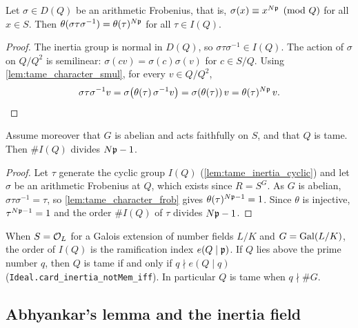 \begin{lemma}
  \label{lem:tame_character_frob}
  \leanok
  Let $\sigma \in D(Q)$ be an arithmetic Frobenius, that is, $\sigma(x) \equiv x^{N\mathfrak{p}}
  \pmod Q$ for all $x \in S$. Then $\theta(\sigma\tau\sigma^{-1}) = \theta(\tau)^{N\mathfrak{p}}$ for all
  $\tau \in I(Q)$.
\end{lemma}

\begin{proof}
  \leanok
  The inertia group is normal in $D(Q)$, so $\sigma\tau\sigma^{-1} \in I(Q)$. The action of
  $\sigma$ on $Q/Q^2$ is semilinear: $\sigma(cv) = \sigma(c)\sigma(v)$ for $c \in S/Q$. Using
  \ref{lem:tame_character_smul}, for every $v \in Q/Q^2$,
  \[
    \sigma\tau\sigma^{-1} v = \sigma\big(\theta(\tau)\,\sigma^{-1} v\big)
      = \sigma(\theta(\tau))\, v = \theta(\tau)^{N\mathfrak{p}}\, v.
  \]
\end{proof}

\begin{lemma}
  \label{lem:abelian_tame_ramificationIdx_dvd}
  \leanok
  Assume moreover that $G$ is abelian and acts faithfully on $S$, and that $Q$ is tame. Then
  $\#I(Q)$ divides $N\mathfrak{p} - 1$.
\end{lemma}

\begin{proof}
  \leanok
  Let $\tau$ generate the cyclic group $I(Q)$ (\ref{lem:tame_inertia_cyclic}) and let $\sigma$ be
  an arithmetic Frobenius at $Q$, which exists since $R = S^G$. As $G$ is abelian,
  $\sigma\tau\sigma^{-1} = \tau$, so \ref{lem:tame_character_frob} gives $\theta(\tau)^{N\mathfrak{p} - 1}
  = 1$. Since $\theta$ is injective, $\tau^{N\mathfrak{p} - 1} = 1$ and the order $\#I(Q)$ of $\tau$ divides
  $N\mathfrak{p} - 1$.
\end{proof}

When $S = \mathcal{O}_L$ for a Galois extension of number fields $L/K$ and $G = \mathrm{Gal}(L/K)$, the order of
$I(Q)$ is the ramification index $e(Q \mid \mathfrak{p})$. If $Q$ lies above the prime number $q$, then $Q$
is tame if and only if $q \nmid e(Q \mid q)$ (\texttt{Ideal.card\_inertia\_notMem\_iff}). In
particular $Q$ is tame when $q \nmid \#G$.

\subsection{Abhyankar's lemma and the inertia field}

